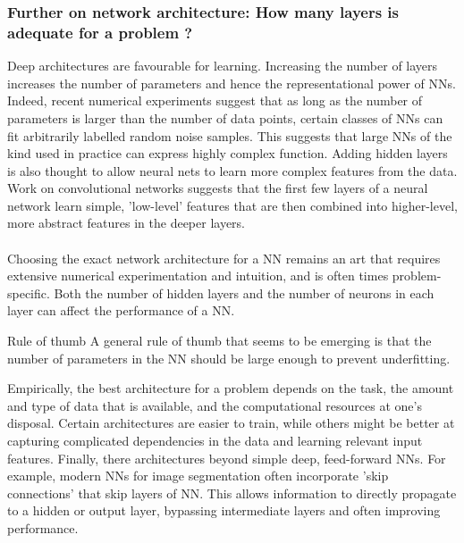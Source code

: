 \subsubsection{Further on network architecture: How many layers is adequate for a problem ?}
\label{subsubsec:dnnBestPracticeArchitecture}
Deep architectures are favourable for learning. Increasing the number of layers increases the number of parameters and hence the representational power of NNs. Indeed, recent numerical experiments suggest that as long as the number of parameters is larger than the number of data points, certain classes of NNs can fit arbitrarily labelled random noise samples. This suggests that large NNs of the kind used in practice can express highly complex function. Adding hidden layers is also thought to allow neural nets to learn more complex features from the data. Work on convolutional networks suggests that the first few layers of a neural network learn simple, ’low-level’ features that are then combined into higher-level, more abstract features in the deeper layers.\\
\\
Choosing the exact network architecture for a NN remains an art that requires extensive numerical experimentation and intuition, and is often times problem-specific. Both the number of hidden layers and the number of neurons in each layer can affect the performance of a NN.
\begin{mybox}{Rule of thumb}
	A general rule of thumb that seems to be emerging is that the number of parameters in the NN should be large enough to prevent underfitting.
\end{mybox}
Empirically, the best architecture for a problem depends on the task, the amount and type of data that is available, and the computational resources at one's disposal. Certain architectures are easier to train, while others might be better at capturing complicated dependencies in the data and learning relevant input features. Finally, there architectures beyond simple deep, feed-forward NNs.
For example, modern NNs for image segmentation often incorporate ’skip connections’ that skip layers of NN. This allows information to directly propagate to a hidden or output layer, bypassing intermediate layers and often improving performance.

